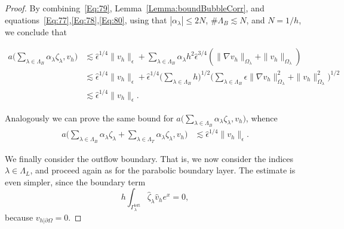 \documentclass[10pt,a4paper]{amsart}
\newcommand{\Gammaleft}{\ensuremath{\Gamma_\lambda^{\text{left}}}\xspace}
\newcommand{\summL}[1][{}]{\ensuremath{\sum_{\lambda\in\Lambda_{#1}}}}
\newcommand{\summLA}[1][{}]{\ensuremath{\sum_{\lambda\in\Lambda_{#1}}\alpha_\lambda}}
\begin{document}
\begin{proof}
By combining~\eqref{Eq:79}, Lemma~\ref{Lemma:boundBubbleCorr}, and equations~\eqref{Eq:77},\eqref{Eq:78},\eqref{Eq:80}, using that $|\alpha_\lambda |\le 2N$, $\#\Lambda_B \lesssim N$, and $N = 1/h$, we conclude that

$$
\begin{aligned}
a\Big(\summLA[B] \zeta_\lambda,v_h\Big) 
    &\lesssim 
    \hat{\epsilon}^{1/4} \|v_h\|_\epsilon
 +  \summLA[B] h^2 \hat{\epsilon}^{3/4} (\|\nabla v_h\|_{\Omega_\lambda} +  \|v_h\|_{\Omega_\lambda}) \\
  & \lesssim
  \hat{\epsilon}^{1/4} \|v_h\|_\epsilon
 +  \hat{\epsilon}^{1/4} \Big(\summL[B] h\Big)^{1/2}  \Big(\summL[B] \epsilon \|\nabla v_h\|_{\Omega_\lambda}^2 + \|v_h\|_{\Omega_\lambda}^2\Big)^{1/2}  \\
   & \lesssim \hat{\epsilon}^{1/4} \|v_h\|_\epsilon.
\end{aligned}
$$

Analogously we can prove the same bound for $a\Big(\summLA[B] \zeta_\lambda,v_h\Big) $, whence
$$
\begin{aligned}
a\Big(\summLA[B] \zeta_\lambda+\summLA[T] \zeta_\lambda,v_h\Big) 
   & \lesssim \hat{\epsilon}^{1/4} \|v_h\|_\epsilon.
\end{aligned}
$$

We finally consider the outflow boundary. That is, we now consider the indices $\lambda\in\Lambda_L$, and
proceed again as for the parabolic boundary layer. The estimate is even simpler, 
since the boundary term
$$
h\int_{\Gammaleft} \hat{\zeta}_\lambda \hat{v}_h e^x = 0,
$$ because $v_{h|\partial\Omega}=0$.
%
\end{proof}
\end{document}
